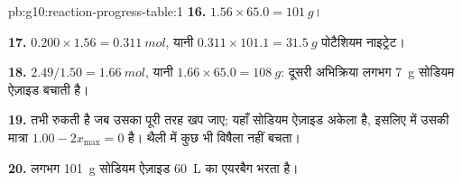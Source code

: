 \begin{solution}{pb:g10:reaction-progress-table:1}
\textbf{16.} $1.56 \times 65.0 = \qty{101}{g}$।

\textbf{17.} $0.200 \times 1.56 = \qty{0.311}{mol}$, यानी
$0.311 \times 101.1 = \qty{31.5}{g}$ पोटैशियम नाइट्रेट।

\textbf{18.} $2.49 / 1.50 = \qty{1.66}{mol}$, यानी
$1.66 \times 65.0 = \qty{108}{g}$: दूसरी अभिक्रिया लगभग
\qty{7}{g} सोडियम ऐज़ाइड बचाती है।

\textbf{19.}  तभी रुकती है जब उसका  पूरी तरह खप
जाए; यहाँ सोडियम ऐज़ाइड अकेला  है, इसलिए  में
उसकी मात्रा $1.00 - 2x_{\max} = 0$ है। थैली में कुछ भी विषैला नहीं बचता।

\textbf{20.} लगभग \qty{101}{g} सोडियम ऐज़ाइड \qty{60}{L} का एयरबैग
भरता है।
\end{solution}
